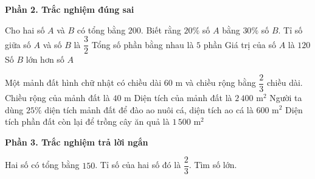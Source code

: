 \textbf{Phần 2. Trắc nghiệm đúng sai}

\begin{ex} %
Cho hai số $A$ và $B$ có tổng bằng $200$. Biết rằng $20\%$ số $A$ bằng $30\%$ số $B$.
\choiceTF
{\True Tỉ số giữa số $A$ và số $B$ là $\dfrac{3}{2}$}
{\True Tổng số phần bằng nhau là $5$ phần}
{\True Giá trị của số $A$ là $120$}
{Số $B$ lớn hơn số $A$}
\end{ex}

\begin{ex} %
Một mảnh đất hình chữ nhật có chiều dài $60\text{ m}$ và chiều rộng bằng $\dfrac{2}{3}$ chiều dài.
\choiceTF
{\True Chiều rộng của mảnh đất là $40\text{ m}$}
{\True Diện tích của mảnh đất là $2\,400\text{ m}^2$}
{\True Người ta dùng $25\%$ diện tích mảnh đất để đào ao nuôi cá, diện tích ao cá là $600\text{ m}^2$}
{Diện tích phần đất còn lại để trồng cây ăn quả là $1\,500\text{ m}^2$}
\end{ex}

\textbf{Phần 3. Trắc nghiệm trả lời ngắn}

\begin{ex} %
Hai số có tổng bằng $150$. Tỉ số của hai số đó là $\dfrac{2}{3}$. Tìm số lớn.
\end{ex}

